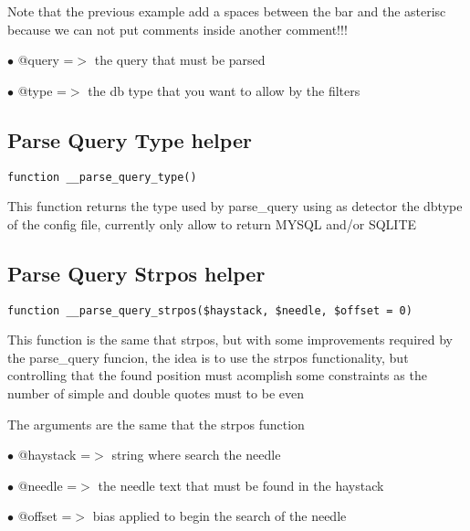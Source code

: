 \documentclass[a4paper]{book}
\begin{document}
Note that the previous example add a spaces between the bar and the asterisc
because we can not put comments inside another comment!!!

\begin{compactitem}
\item[\color{myblue}$\bullet$] @query =$>$ the query that must be parsed
\item[\color{myblue}$\bullet$] @type  =$>$ the db type that you want to allow by the filters
\end{compactitem}

\hypertarget{toc246}{}
\subsection{Parse Query Type helper}

\begin{lstlisting}
function __parse_query_type()
\end{lstlisting}

This function returns the type used by parse\_query using as detector the
dbtype of the config file, currently only allow to return MYSQL and/or SQLITE

\hypertarget{toc247}{}
\subsection{Parse Query Strpos helper}

\begin{lstlisting}
function __parse_query_strpos($haystack, $needle, $offset = 0)
\end{lstlisting}

This function is the same that strpos, but with some improvements required
by the parse\_query funcion, the idea is to use the strpos functionality, but
controlling that the found position must acomplish some constraints as the
number of simple and double quotes must to be even

The arguments are the same that the strpos function

\begin{compactitem}
\item[\color{myblue}$\bullet$] @haystack =$>$ string where search the needle
\item[\color{myblue}$\bullet$] @needle   =$>$ the needle text that must be found in the haystack
\item[\color{myblue}$\bullet$] @offset   =$>$ bias applied to begin the search of the needle
\end{compactitem}
\end{document}
